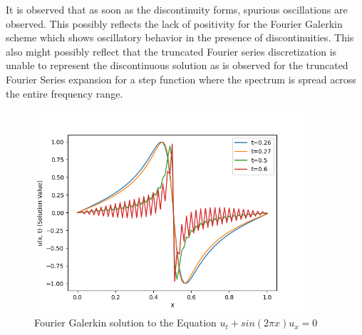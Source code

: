 \documentclass[12pt,dvipsnames]{article}
\begin{document}
It is observed that as soon as the discontinuity forms, spurious oscillations are observed. This possibly reflects the lack of positivity for the Fourier Galerkin scheme which shows oscillatory behavior in the presence of discontinuities. This also might possibly reflect that the truncated Fourier series discretization is unable to represent the discontinuous solution as is observed for the truncated Fourier Series expansion for a step function where the spectrum is spread across the entire frequency range.
\begin{figure}
    \centering
    \includegraphics[width=10cm]{uxplot_Q1.png}
    \caption{Fourier Galerkin solution to the Equation $u_t + sin(2 \pi x)u_x = 0$}
    \label{fig:app:uxplot}
\end{figure}
\end{document}
